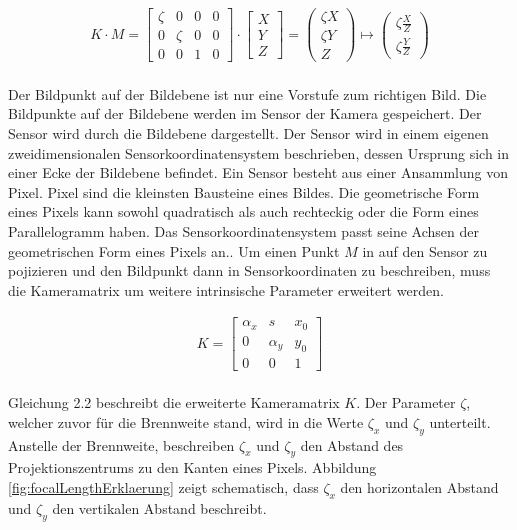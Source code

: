 \begin{gather}
	K\cdot M =
	\begin{bmatrix}
		\zeta&0&0&0\\
		0&\zeta&0&0\\
		0&0&1&0
	\end{bmatrix}
	\cdot
	\begin{bmatrix}
		X\\Y\\Z
	\end{bmatrix}
=
	\begin{pmatrix}
	\zeta X\\ \zeta Y\\ Z
\end{pmatrix}
	\mapsto
	\begin{pmatrix}
		\zeta \frac{X}{Z}\\ \zeta \frac{Y}{Z}
	\end{pmatrix}
\end{gather}\\

Der Bildpunkt auf der Bildebene ist nur eine Vorstufe zum richtigen Bild. Die Bildpunkte auf der Bildebene werden im Sensor der Kamera gespeichert. Der Sensor wird durch die Bildebene dargestellt. Der Sensor wird in einem eigenen zweidimensionalen Sensorkoordinatensystem beschrieben, dessen Ursprung sich in einer Ecke der Bildebene befindet. Ein Sensor besteht aus einer Ansammlung von Pixel. Pixel sind die kleinsten Bausteine eines Bildes. Die geometrische Form eines Pixels kann sowohl quadratisch als auch rechteckig oder die Form eines Parallelogramm haben. Das Sensorkoordinatensystem passt seine Achsen der geometrischen Form eines Pixels an.\cite{HZ,CamerModels.}. Um einen Punkt $M$ in auf den Sensor zu pojizieren und den Bildpunkt dann in Sensorkoordinaten zu beschreiben, muss die Kameramatrix um weitere intrinsische Parameter erweitert werden. 

\begin{gather}
	K=\begin{bmatrix}
		\alpha_x&s&x_{0}\\
		0&\alpha_y&y_{0}\\
		0&0&1
	\end{bmatrix}
\end{gather}\\

Gleichung 2.2 beschreibt die erweiterte Kameramatrix $K$. Der Parameter $\zeta$, welcher zuvor für die Brennweite stand, wird in die Werte $\zeta_x$ und $\zeta_y$ unterteilt. Anstelle der Brennweite, beschreiben $\zeta_x$ und $\zeta_y$ den Abstand des Projektionszentrums zu den Kanten eines Pixels. Abbildung \ref{fig:focalLengthErklaerung} zeigt schematisch, dass $\zeta_x$ den horizontalen Abstand und $\zeta_y$ den vertikalen Abstand beschreibt\cite{HZ}.


